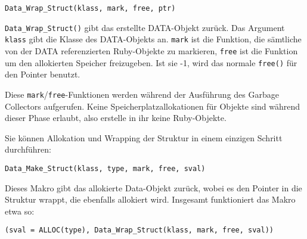 \begin{lstlisting}
Data_Wrap_Struct(klass, mark, free, ptr)
\end{lstlisting}

\noindent\verb+Data_Wrap_Struct()+ gibt das erstellte DATA-Objekt zurück. Das Argument
\verb+klass+ gibt die Klasse des DATA-Objekts an. \verb+mark+ ist die
Funktion, die sämtliche von der DATA referenzierten Ruby-Objekte zu
markieren, \verb+free+ ist die Funktion um den allokierten Speicher
freizugeben. Ist sie -1, wird das normale \verb+free()+ für den
Pointer benutzt.

Diese \verb+mark+/\verb+free+-Funktionen werden während der Ausführung
des Garbage Collectors aufgerufen. Keine Speicherplatzallokationen für
Objekte sind während dieser Phase erlaubt, also erstelle in ihr keine
Ruby-Objekte.


Sie können Allokation und Wrapping der Struktur in einem einzigen
Schritt durchführen:

\begin{lstlisting}
Data_Make_Struct(klass, type, mark, free, sval)
\end{lstlisting}

\noindent Dieses Makro gibt das allokierte Data-Objekt zurück, wobei
es den Pointer in die Struktur wrappt, die ebenfalls allokiert
wird. Insgesamt funktioniert das Makro etwa so:

\begin{lstlisting}
(sval = ALLOC(type), Data_Wrap_Struct(klass, mark, free, sval))
\end{lstlisting}

